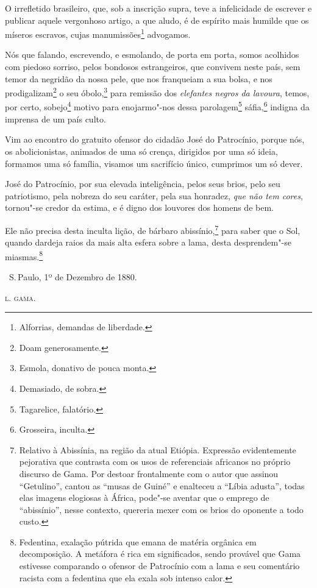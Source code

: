 O irrefletido brasileiro, que, sob a inscrição supra, teve a
infelicidade de escrever e publicar aquele vergonhoso artigo, a que
aludo, é de espírito mais humilde que os míseros escravos, cujas
manumissões\footnote{Alforrias, demandas de liberdade.} advogamos.

Nós que falando, escrevendo, e esmolando, de porta em porta, somos
acolhidos com piedoso sorriso, pelos bondosos estrangeiros, que convivem
neste país, sem temor da negridão da nossa pele, que nos franqueiam a
sua bolsa, e nos prodigalizam\footnote{Doam generosamente.} o seu
óbolo,\footnote{Esmola, donativo de pouca monta.} para remissão dos
\emph{elefantes negros da lavoura}, temos, por certo, sobejo\footnote{
  Demasiado, de sobra.} motivo para enojarmo"-nos dessa
parolagem\footnote{Tagarelice, falatório.} sáfia,\footnote{
  Grosseira, inculta.} indigna da imprensa de um país culto.

Vim ao encontro do gratuito ofensor do cidadão José do Patrocínio,
porque nós, os abolicionistas, animados de uma só crença, dirigidos por
uma só ideia, formamos uma só família, visamos um sacrifício único,
cumprimos um só dever.

José do Patrocínio, por sua elevada inteligência, pelos seus brios, pelo
seu patriotismo, pela nobreza do seu caráter, pela sua honradez,
\emph{que não tem cores}, tornou"-se credor da estima, e é digno dos
louvores dos homens de bem.

Ele não precisa desta inculta lição, de bárbaro abissínio,\footnote{
  Relativo à Abissínia, na região da atual Etiópia. Expressão
  evidentemente pejorativa que contrasta com os usos de referenciais
  africanos no próprio discurso de Gama. Por destoar frontalmente com o
  autor que assinou ``Getulino'', cantou as ``musas de Guiné'' e enalteceu a
  ``Líbia adusta'', todas elas imagens elogiosas à África, pode"-se aventar
  que o emprego de ``abissínio'', nesse contexto, quereria mexer com os
  brios do oponente a todo custo.} para saber que o Sol, quando dardeja
raios da mais alta esfera sobre a lama, desta desprendem"-se
miasmas.\footnote{Fedentina, exalação pútrida que emana de matéria
  orgânica em decomposição. A metáfora é rica em significados, sendo
  provável que Gama estivesse comparando o ofensor de Patrocínio com a
  lama e seu comentário racista com a fedentina que ela exala sob
  intenso calor.}

\bigskip

\hfill\ S.\,Paulo, 1º de Dezembro de 1880.\smallskip

\hfill\textsc{l. gama.}

